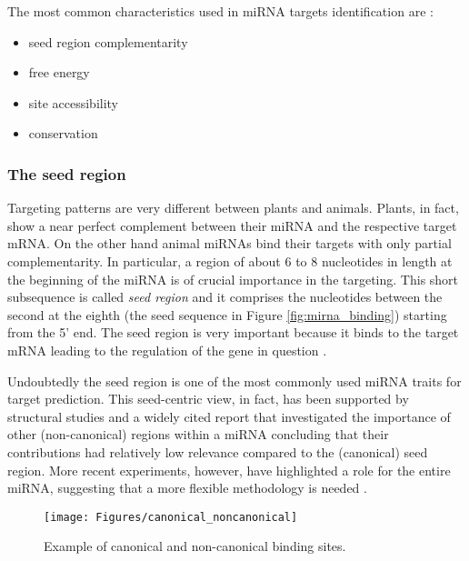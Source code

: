The most common characteristics used in miRNA targets identification are \cite{common_features}:
\begin{itemize}
	\item seed region complementarity
	\item free energy
	\item site accessibility
	\item conservation
\end{itemize}

\subsubsection{The seed region}
Targeting patterns are very different between plants and animals. Plants, in fact, show a near perfect complement between their miRNA and the respective target mRNA. On the other hand animal miRNAs bind their targets with only partial complementarity. In particular, a region of about 6 to 8 nucleotides in length at the beginning of the miRNA is of crucial importance in the targeting.  This short subsequence is called \emph{seed region} and it comprises the nucleotides between the second at the eighth (the seed sequence in Figure \ref{fig:mirna_binding}) starting from the 5' end. 
The seed region is very important because it binds to the target mRNA leading to the regulation of the gene in question \cite{mirna_overview}.

Undoubtedly the seed region is one of the most commonly used miRNA traits for target prediction. This seed-centric view, in fact,  has been supported by structural studies \cite{structural_basis} and a widely cited report  \cite{canonical_target} that investigated the importance of other (non-canonical) regions within a miRNA concluding that their contributions had relatively low relevance compared to the (canonical)
seed region. More recent experiments, however, have highlighted a role for the entire miRNA, suggesting that a more flexible methodology is needed \cite{helwak}.

\begin{figure}[hbt!]
	\centering
	\texttt{[image: Figures/canonical\_noncanonical]}
	\caption{Example of canonical and non-canonical binding sites.}
	\label{fig:canonical_binding}
\end{figure}

